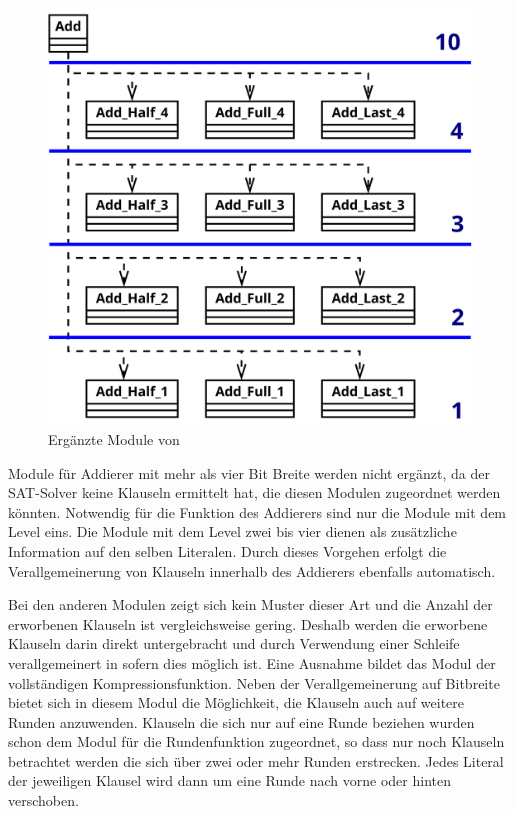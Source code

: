 \begin{figure}[!h]
  \centering
  \includegraphics[scale=0.265]{images/module_add}
  \caption{Ergänzte Module von }
  \label{fig:sha256_module_add}
\end{figure}

Module für Addierer mit mehr als vier Bit Breite werden nicht ergänzt, da der SAT-Solver keine Klauseln ermittelt hat, die diesen Modulen zugeordnet werden könnten.  
Notwendig für die Funktion des Addierers sind nur die Module mit dem Level eins. Die Module mit dem Level zwei bis vier dienen als zusätzliche Information
auf den selben Literalen. Durch dieses Vorgehen erfolgt die Verallgemeinerung von Klauseln innerhalb des Addierers ebenfalls automatisch.

Bei den anderen Modulen zeigt sich kein Muster dieser Art und die Anzahl der erworbenen Klauseln ist vergleichsweise gering. Deshalb werden die erworbene Klauseln
darin direkt untergebracht und durch Verwendung einer Schleife verallgemeinert in sofern dies möglich ist. Eine Ausnahme bildet das Modul der vollständigen
Kompressionsfunktion. Neben der Verallgemeinerung auf Bitbreite bietet sich in diesem Modul die Möglichkeit, die Klauseln auch auf weitere Runden anzuwenden.
Klauseln die sich nur auf eine Runde beziehen wurden schon dem Modul für die Rundenfunktion zugeordnet, so dass nur noch Klauseln betrachtet werden die sich über
zwei oder mehr Runden erstrecken. Jedes Literal der jeweiligen Klausel wird dann um eine Runde nach vorne oder hinten verschoben.

